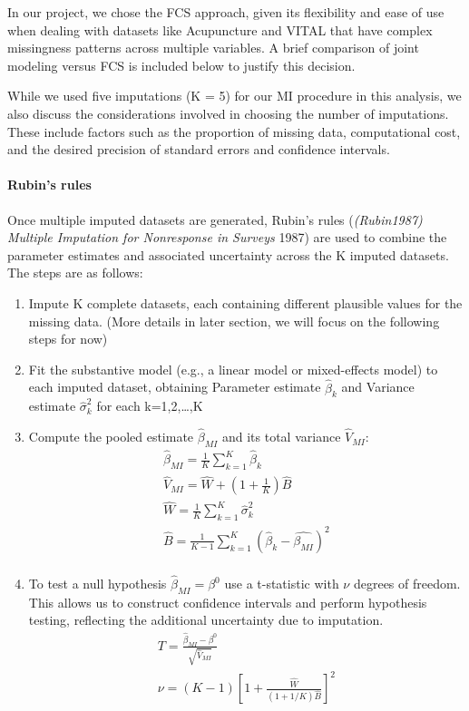 \documentclass{article}
\begin{document}
In our project, we chose the FCS approach, given its flexibility and
ease of use when dealing with datasets like Acupuncture and VITAL that
have complex missingness patterns across multiple variables. A brief
comparison of joint modeling versus FCS is included below to justify
this decision.

While we used five imputations (K = 5) for our MI procedure in this
analysis, we also discuss the considerations involved in choosing the
number of imputations. These include factors such as the proportion of
missing data, computational cost, and the desired precision of standard
errors and confidence intervals.

\paragraph{Rubin's rules}\label{rubins-rules}

Once multiple imputed datasets are generated, Rubin's rules
(\emph{(Rubin1987) Multiple Imputation for Nonresponse in Surveys} 1987)
are used to combine the parameter estimates and associated uncertainty
across the K imputed datasets. The steps are as follows:

\begin{enumerate}
\def\labelenumi{\arabic{enumi}.}
\item
  Impute K complete datasets, each containing different plausible values
  for the missing data. (More details in later section, we will focus on
  the following steps for now)
\item
  Fit the substantive model (e.g., a linear model or mixed-effects
  model) to each imputed dataset, obtaining Parameter estimate
  \(\hat{\beta}_{k}\) and Variance estimate \(\hat{\sigma}_{k}^{2}\) for
  each k=1,2,\ldots,K
\item
  Compute the pooled estimate \(\hat{\beta}_{MI}\) and its total
  variance \(\hat{V}_{MI}\): \begin{align*}
    \hat{\beta}_{MI} = \frac{1}{K} \sum_{k=1}^{K}{\hat{\beta}_{k}} \\
    \hat{V}_{MI} = \hat{W} + (1 + \frac{1}{K}) \hat{B} \\
    \hat{W} = \frac{1}{K} \sum^{K}_{k=1}{\hat{\sigma}^{2}_{k}} \\
    \hat{B} = \frac{1}{K-1} \sum^{K}_{k=1}({\hat{\beta}_{k}} - \hat{\beta_{MI}})^{2} \\
    \end{align*}
\item
  To test a null hypothesis \(\hat{\beta}_{MI} = \beta^{0}\) use a
  t-statistic with \(\nu\) degrees of freedom. This allows us to
  construct confidence intervals and perform hypothesis testing,
  reflecting the additional uncertainty due to imputation.
  \begin{align*}
    T = \frac{\hat{\beta}_{MI} - \beta^{0}}  {\sqrt{\hat{V}_{MI}}} \\
    \nu = (K-1)[1 + \frac{\hat{W}}{(1 + 1/K) \hat{B}}]^{2}
    \end{align*}
\end{enumerate}
\end{document}
